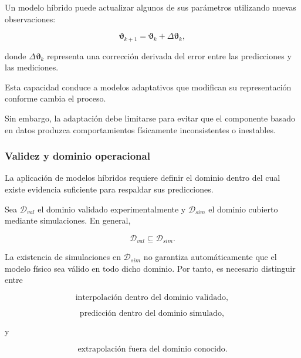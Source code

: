 Un modelo híbrido puede actualizar algunos de sus parámetros utilizando nuevas observaciones:

\begin{equation}
\boldsymbol{\vartheta}_{k+1}
=
\boldsymbol{\vartheta}_{k}
+
\Delta\boldsymbol{\vartheta}_{k},
\end{equation}

donde $\Delta\boldsymbol{\vartheta}_{k}$ representa una corrección derivada del error entre las predicciones y las mediciones.

Esta capacidad conduce a modelos adaptativos que modifican su representación conforme cambia el proceso.

Sin embargo, la adaptación debe limitarse para evitar que el componente basado en datos produzca comportamientos físicamente inconsistentes o inestables.

\subsubsection{Validez y dominio operacional}

La aplicación de modelos híbridos requiere definir el dominio dentro del cual existe evidencia suficiente para respaldar sus predicciones.

Sea $\mathcal{D}_{val}$ el dominio validado experimentalmente y $\mathcal{D}_{sim}$ el dominio cubierto mediante simulaciones. En general,

\begin{equation}
\mathcal{D}_{val}
\subseteq
\mathcal{D}_{sim}.
\end{equation}

La existencia de simulaciones en $\mathcal{D}_{sim}$ no garantiza automáticamente que el modelo físico sea válido en todo dicho dominio. Por tanto, es necesario distinguir entre

\begin{equation}
\text{interpolación dentro del dominio validado},
\end{equation}

\begin{equation}
\text{predicción dentro del dominio simulado},
\end{equation}

y

\begin{equation}
\text{extrapolación fuera del dominio conocido}.
\end{equation}

